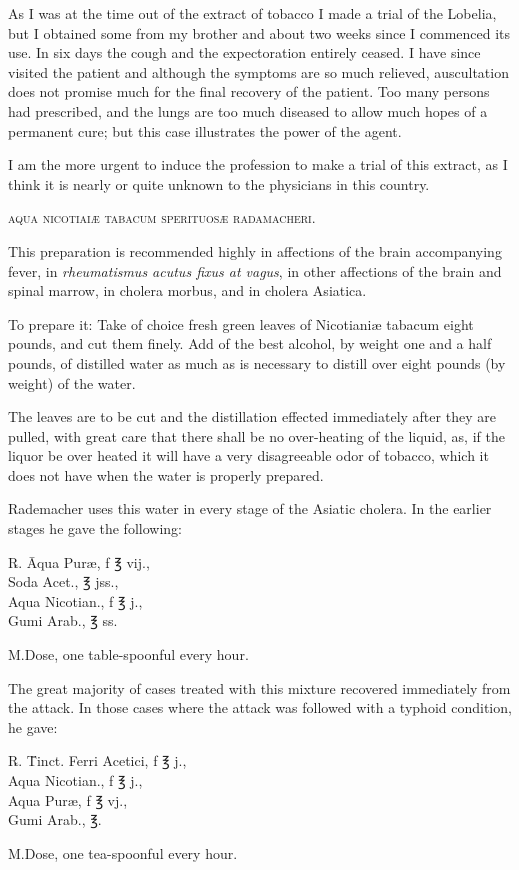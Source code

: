
As I was at the time out of the extract of tobacco I made a trial of
the Lobelia, but I obtained some from my brother and about two
weeks since I commenced its use. In six days the cough and the expectoration
entirely ceased. I have since visited the patient and although
the symptoms are so much relieved, auscultation does not promise much
for the final recovery of the patient. Too many persons had prescribed,
and the lungs are too much diseased to allow much hopes of a permanent
cure; but this case illustrates the power of the agent.

I am the more urgent to induce the profession to make a trial of
this extract, as I think it is nearly or quite unknown to the physicians
in this country.

\begin{center}\textsc{aqua nicotiaiæ tabacum sperituosæ radamacheri.}\end{center}

This preparation is recommended highly in affections of the brain
accompanying fever, in \emph{rheumatismus acutus fixus at vagus}, in other
affections of the brain and spinal marrow, in cholera morbus, and in
cholera Asiatica.

To prepare it: Take of choice fresh green leaves of Nicotianiæ tabacum
eight pounds, and cut them finely. Add of the best alcohol,
by weight one and a half pounds, of distilled water as much as is
necessary to distill over eight pounds (by weight) of the water.

The leaves are to be cut and the distillation effected immediately
after they are pulled, with great care that there shall be no over-heating
of the liquid, as, if the liquor be over heated it will have a very disagreeable
odor of tobacco, which it does not have when the water is
properly prepared.

Rademacher uses this water in every stage of the Asiatic cholera.
In the earlier stages he gave the following:
  \begin{tabbing}
    \textsf{℞}. \= Aqua Puræ, f \textsf{℥} vij., \\
      \> Soda Acet., \textsf{℥} jss., \\
      \> Aqua Nicotian., f \textsf{℥} j., \\
      \> Gumi Arab., \textsf{℥} ss. \\
  \end{tabbing}
M.\quad{}Dose, one table-spoonful every hour.


The great majority of cases treated with this mixture recovered
immediately from the attack. In those cases where the attack was followed
with a typhoid condition, he gave:
  \begin{tabbing}
    \textsf{℞}. \= Tinct. Ferri Acetici, f \textsf{℥} j., \\
      \> Aqua Nicotian., f \textsf{℥} j., \\
      \> Aqua Puræ, f \textsf{℥} vj., \\
      \> Gumi Arab., \textsf{℥}. \\
  \end{tabbing}
M.\quad{}Dose, one tea-spoonful every hour.
\endinput
